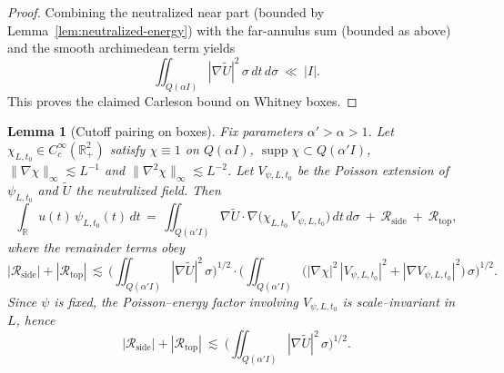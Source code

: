 \documentclass[11pt]{article}
\newtheorem{lemma}[theorem]{Lemma}
\theoremstyle{definition}
\theoremstyle{remark}
\newcommand{\R}{\mathbb{R}}
\begin{document}
\begin{proof}
Combining the neutralized near part (bounded by Lemma~\ref{lem:neutralized-energy}) with the far-annulus sum (bounded as above) and the smooth archimedean term yields
\[
 \iint_{Q(\alpha I)} |\nabla \widetilde U|^2\,\sigma\,dt\,d\sigma\ \ll\ |I|.
\]
This proves the claimed Carleson bound on Whitney boxes.
\end{proof}

\begin{lemma}[Cutoff pairing on boxes]\label{lem:cutoff-pairing}
Fix parameters $\alpha'>\alpha>1$. Let $\chi_{L,t_0}\in C_c^\infty(\R^2_+)$ satisfy $\chi\equiv1$ on $Q(\alpha I)$, $\operatorname{supp}\chi\subset Q(\alpha'I)$,
$\|\nabla\chi\|_\infty\lesssim L^{-1}$ and $\|\nabla^2\chi\|_\infty\lesssim L^{-2}$. Let $V_{\psi,L,t_0}$ be the Poisson extension of $\psi_{L,t_0}$ and $\widetilde U$ the neutralized field. Then
\[
 \int_{\R} u(t)\,\psi_{L,t_0}(t)\,dt
 \,=\, \iint_{Q(\alpha'I)} \nabla \widetilde U\cdot \nabla\big(\chi_{L,t_0}\, V_{\psi,L,t_0}\big)\,dt\,d\sigma\ +\ \mathcal R_{\mathrm{side}}\ +\ \mathcal R_{\mathrm{top}},
\]
where the remainder terms obey
\[
 |\mathcal R_{\mathrm{side}}|+|\mathcal R_{\mathrm{top}}|
 \,\lesssim\, \Big(\iint_{Q(\alpha'I)} |\nabla \widetilde U|^2\,\sigma\Big)^{1/2}
               \cdot \Big(\iint_{Q(\alpha' I)} \big(|\nabla\chi|^2\,|V_{\psi,L,t_0}|^2+|\nabla V_{\psi,L,t_0}|^2\big)\,\sigma\Big)^{1/2}.
\]
Since $\psi$ is fixed, the Poisson–energy factor involving $V_{\psi,L,t_0}$ is scale–invariant in $L$, hence
\[
 |\mathcal R_{\mathrm{side}}|+|\mathcal R_{\mathrm{top}}|\ \lesssim\ \Big(\iint_{Q(\alpha'I)} |\nabla \widetilde U|^2\,\sigma\Big)^{1/2}.
\]
\end{lemma}
\end{document}
